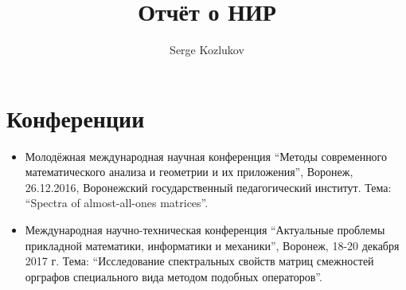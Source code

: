 \documentclass[a4paper]{article}
\title{Отчёт о НИР}
\author{Serge Kozlukov}
\begin{document}
\maketitle

\section*{Конференции}
\begin{itemize}
\item
    Молодёжная международная научная конференция
    ``Методы современного математического анализа и геометрии и их приложения'',
    Воронеж,
    26.12.2016,
    Воронежский государственный педагогический институт.
    Тема: ``Spectra of almost-all-ones matrices''.
\item 
    Международная научно-техническая конференция
    ``Актуальные проблемы прикладной
    математики, информатики и механики'',
    Воронеж,
    18-20 декабря 2017 г.
    Тема: ``Исследование спектральных свойств матриц смежностей орграфов специального вида методом подобных операторов''.
\end{itemize}

\nocite{*}
\printbibliography
\end{document}
